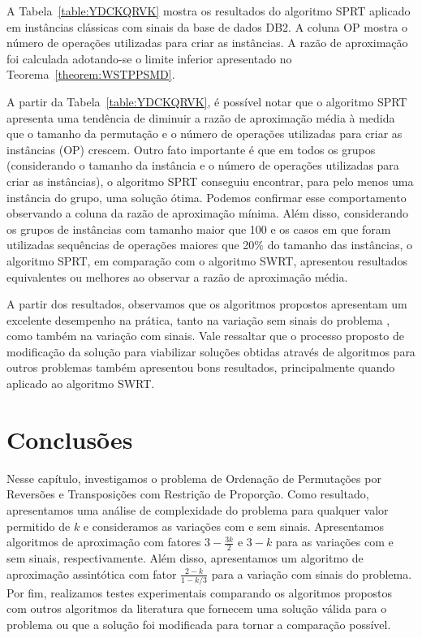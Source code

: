 A Tabela~\ref{table:YDCKQRVK} mostra os resultados do algoritmo SPRT aplicado em instâncias clássicas com sinais da base de dados DB2. A coluna OP mostra o número de operações utilizadas para criar as instâncias. A razão de aproximação foi calculada adotando-se o limite inferior apresentado no Teorema~\ref{theorem:WSTPPSMD}.



A partir da Tabela~\ref{table:YDCKQRVK}, é possível notar que o algoritmo SPRT apresenta uma tendência de diminuir a razão de aproximação média à medida que o tamanho da permutação e o número de operações utilizadas para criar as instâncias (OP) crescem. Outro fato importante é que em todos os grupos (considerando o tamanho da instância e o número de operações utilizadas para criar as instâncias), o algoritmo SPRT conseguiu encontrar, para pelo menos uma instância do grupo, uma solução ótima. Podemos confirmar esse comportamento observando a coluna da razão de aproximação mínima. Além disso, considerando os grupos de instâncias com tamanho maior que 100 e os casos em que foram utilizadas sequências de operações maiores que 20\% do tamanho das instâncias, o algoritmo SPRT, em comparação com o algoritmo SWRT, apresentou resultados equivalentes ou melhores ao observar a razão de aproximação média.

A partir dos resultados, observamos que os algoritmos propostos apresentam um excelente desempenho na prática, tanto na variação sem sinais do problema \SbPRT, como também na variação com sinais. Vale ressaltar que o processo proposto de modificação da solução para viabilizar soluções obtidas através de algoritmos para outros problemas também apresentou bons resultados, principalmente quando aplicado ao algoritmo SWRT.

\section{Conclusões}

Nesse capítulo, investigamos o problema de Ordenação de Permutações por Reversões e Transposições com Restrição de Proporção. Como resultado, apresentamos uma análise de complexidade do problema para qualquer valor permitido de $k$ e consideramos as variações com e sem sinais. Apresentamos algoritmos de aproximação com fatores $3 - \frac{3k}{2}$ e $3-k$ para as variações com e sem sinais, respectivamente. Além disso, apresentamos um algoritmo de aproximação assintótica com fator $\frac{2-k}{1-k/3}$ para a variação com sinais do problema. Por fim, realizamos testes experimentais comparando os algoritmos propostos com outros algoritmos da literatura que fornecem uma solução válida para o problema ou que a solução foi modificada para tornar a comparação possível.